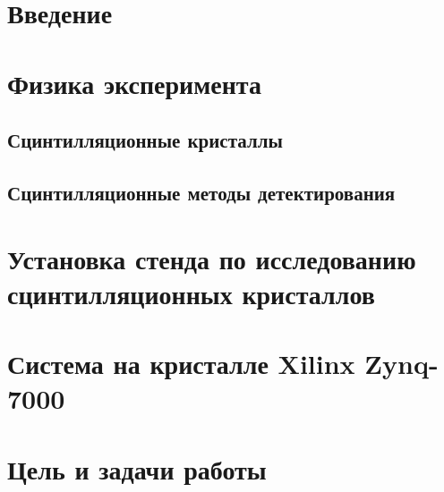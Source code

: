 \documentclass[a4paper, 14pt]{extarticle}
\begin{document}


\tableofcontents
\thispagestyle{empty}
\newpage

\setcounter{page}{3}
\section*{Введение}
    
    \newpage

\section{Физика эксперимента}
    
    \subsection{Сцинтилляционные кристаллы}
    
    \subsection{Сцинтилляционные методы детектирования}
    
    \newpage

\section{Установка стенда по исследованию сцинтилляционных кристаллов}
    
%    
    \newpage

\section{Система на кристалле Xilinx Zynq-7000}
    
    \newpage
    
\section{Цель и задачи работы}
    
    \newpage
    
\end{document}
